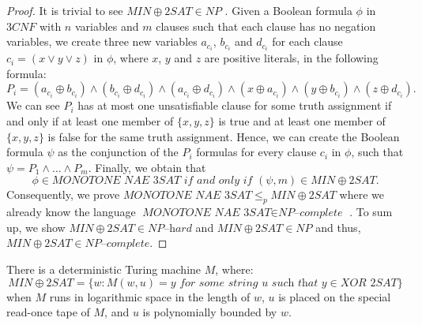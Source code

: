 \documentclass[a4paper,UKenglish,cleveref, autoref]{lipics-v2019}
\begin{document}
\begin{proof}
It is trivial to see $MIN\oplus2SAT \in NP$ \cite{Pap03}. Given a Boolean formula $\phi$ in $3CNF$ with $n$ variables and $m$ clauses such that each clause has no negation variables, we create three new variables $a_{c_{i}}$, $b_{c_{i}}$ and $d_{c_{i}}$ for each clause $c_{i} = (x \vee y \vee z)$ in $\phi$, where $x$, $y$ and $z$ are positive literals, in the following formula:
\[P_{i} = (a_{c_{i}} \oplus b_{c_{i}}) \wedge (b_{c_{i}} \oplus d_{c_{i}}) \wedge (a_{c_{i}} \oplus d_{c_{i}}) \wedge (x \oplus a_{c_{i}}) \wedge (y \oplus b_{c_{i}}) \wedge (z \oplus d_{c_{i}}).\]
We can see $P_{i}$ has at most one unsatisfiable clause for some truth assignment if and only if at least one member of $\{x,y,z\}$ is true and at least one member of $\{x,y,z\}$ is false for the same truth assignment. Hence, we can create the Boolean formula $\psi$ as the conjunction of the $P_{i}$ formulas for every clause $c_{i}$ in $\phi$, such that $\psi = P_{1} \wedge \ldots \wedge P_{m}$. Finally, we obtain that
\[\phi \in \textit{MONOTONE NAE 3SAT} \textit{ if and only if } (\psi, m) \in MIN\oplus2SAT.\]
Consequently, we prove $\textit{MONOTONE NAE 3SAT} \leq_{p} MIN\oplus2SAT$ where we already know the language $\textit{MONOTONE NAE 3SAT} \in \textit{NP--complete}$ \cite{GJ79}. To sum up, we show $MIN\oplus2SAT \in \textit{NP--hard}$ and $MIN\oplus2SAT \in NP$ and thus, $MIN\oplus2SAT \in \textit{NP--complete}$.
\end{proof}

\begin{theorem}
\label{proof}
There is a deterministic Turing machine $M$, where:
\[MIN\oplus2SAT = \{w: M(w, u) = y \textit{ for some string } u \textit{ such that } y \in \textit{XOR 2SAT}\}\]
when $M$ runs in logarithmic space in the length of $w$, $u$ is placed on the special read-once tape of $M$, and $u$ is polynomially bounded by $w$.
\end{theorem}
\end{document}
